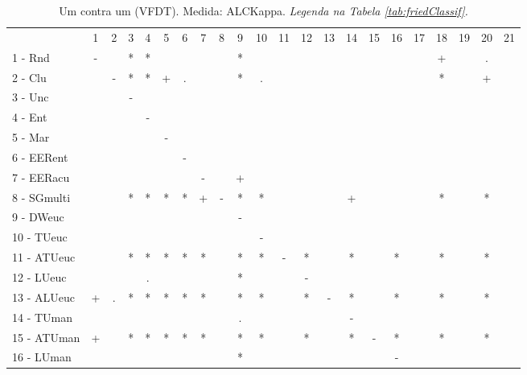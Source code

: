 \begin{table}[h]
\caption{Um contra um (VFDT). Medida: ALCKappa. \textit{Legenda na Tabela \ref{tab:friedClassif}.}}
\begin{center}\begin{tabular}{lcc|cc|cc|cc|cc|cc|cc|cc|cc|cc|c}
 			& 1 & 2 & 3 & 4 & 5 & 6 & 7 & 8 & 9 & 10 & 11 & 12 & 13 & 14 & 15 & 16 & 17 & 18 & 19 & 20 & 21\\
1 - Rnd  	& - &   & * & * &   &   &   &   & * &   &   &   &   &   &   &   &   & + &   & . &   \\
2 - Clu  	&   & - & * & * & + & . &   &   & * & . &   &   &   &   &   &   &   & * &   & + &   \\ \hline
3 - Unc  	&   &   & - &   &   &   &   &   &   &   &   &   &   &   &   &   &   &   &   &   &   \\
4 - Ent  	&   &   &   & - &   &   &   &   &   &   &   &   &   &   &   &   &   &   &   &   &   \\ \hline
5 - Mar  	&   &   &   &   & - &   &   &   &   &   &   &   &   &   &   &   &   &   &   &   &   \\
6 - EERent	&   &   &   &   &   & - &   &   &   &   &   &   &   &   &   &   &   &   &   &   &   \\ \hline
7 - EERacu	&   &   &   &   &   &   & - &   & + &   &   &   &   &   &   &   &   &   &   &   &   \\
8 - SGmulti	&   &   & * & * & * & * & + & - & * & * &   &   &   & + &   &   &   & * &   & * &   \\ \hline
9 - DWeuc	&   &   &   &   &   &   &   &   & - &   &   &   &   &   &   &   &   &   &   &   &   \\
10 - TUeuc	&   &   &   &   &   &   &   &   &   & - &   &   &   &   &   &   &   &   &   &   &   \\ \hline
11 - ATUeuc	&   &   & * & * & * & * & * &   & * & * & - & * &   & * &   & * &   & * &   & * &   \\
12 - LUeuc	&   &   &   & . &   &   &   &   & * &   &   & - &   &   &   &   &   &   &   &   &   \\ \hline
13 - ALUeuc	& + & . & * & * & * & * & * &   & * & * &   & * & - & * &   & * &   & * &   & * &   \\
14 - TUman	&   &   &   &   &   &   &   &   & . &   &   &   &   & - &   &   &   &   &   &   &   \\ \hline
15 - ATUman	& + &   & * & * & * & * & * &   & * & * &   & * &   & * & - & * &   & * &   & * &   \\
16 - LUman	&   &   &   &   &   &   &   &   & * &   &   &   &   &   &   & - &   &   &   &   &   \\ \hline

\end{tabular}
\end{center}
\end{table}
